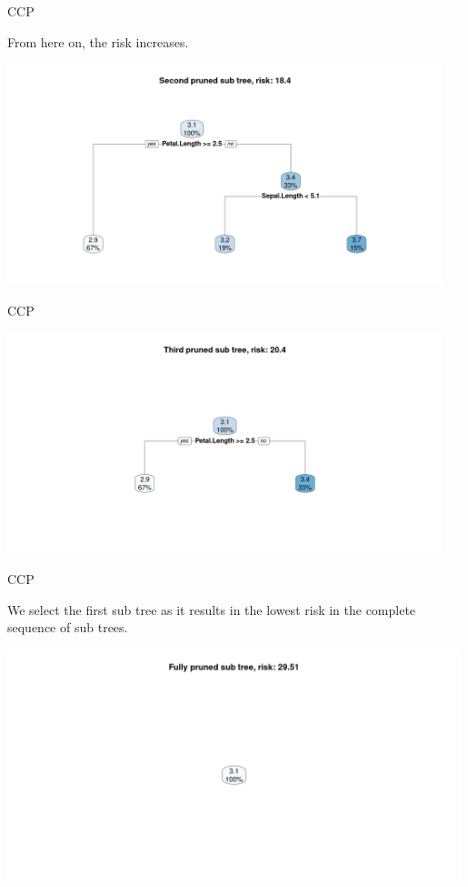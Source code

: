 \documentclass[11pt,compress,t,notes=noshow, xcolor=table]{beamer}
\begin{document}
\begin{frame}[noframenumbering]{CCP}

From here on, the risk increases.
\vspace{0.25cm}


{\centering \includegraphics[width=0.95\textwidth]{figure/ccp_3.pdf} 

}

\end{frame}

\begin{frame}[noframenumbering]{CCP}


{\centering \includegraphics[width=0.95\textwidth]{figure/ccp_4.pdf} 

}


\end{frame}

\begin{frame}[noframenumbering]{CCP}

We select the first sub tree as it results in the lowest risk in the complete sequence of sub trees.
\vspace{0.25cm}


{\centering \includegraphics[width=0.99\textwidth]{figure/ccp_5.pdf} 

}


\end{frame}



\endlecture
\end{document}

